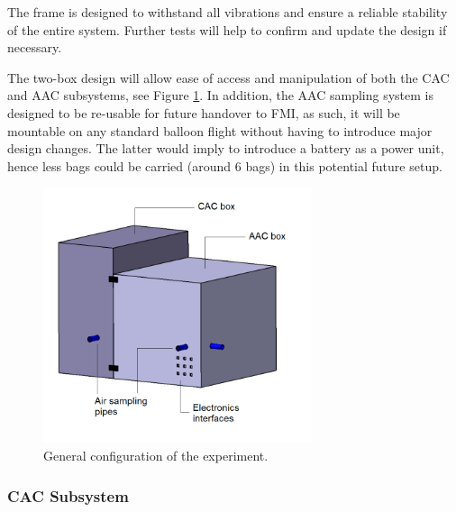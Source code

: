 The frame is designed to withstand all vibrations and ensure a reliable stability of the entire system. Further tests will help to confirm and update the design if necessary. 

The two-box design will allow ease of access and manipulation of both the CAC and AAC subsystems, see Figure \ref{overview}. In addition, the AAC sampling system is designed to be re-usable for future handover to FMI, as such, it will be mountable on any standard balloon flight without having to introduce major design changes. The latter would imply to introduce a battery as a power unit, hence less bags could be carried (around 6 bags) in this potential future setup.


\begin{figure}[!ht]
    \centering
    \includegraphics[width=0.7\textwidth]{4-experiment-design/img/overview_names.png}
    \caption{General configuration of the experiment.}
    \label{overview}
\end{figure}

\subsubsection{CAC Subsystem}

